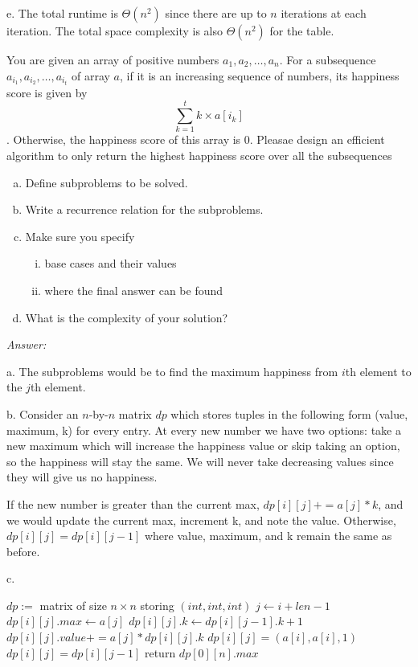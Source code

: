 \documentclass[12pt]{article}
\newenvironment{problem}[2][Problem]{\begin{trivlist}
\item[\hskip \labelsep {\bfseries #1}\hskip \labelsep {\bfseries #2.}]}{\end{trivlist}}
\begin{document}
e. The total runtime is $\Theta(n^2)$ since there are up to $n$ iterations at each iteration. The total space complexity is also $\Theta(n^2)$ for the table.
\begin{problem}{3}
    You are given an array of positive numbers $a_1, a_2, \dots, a_n$. For a subsequence $a_{i_1}, a_{i_2}, \dots, a_{i_t}$ of array $a$, if it is an increasing sequence of numbers, its happiness score is given by $$ \sum_{k=1}^t k \times a[i_k]$$. Otherwise, the happiness score of this array is 0. Pleasae design an efficient algorithm to only return the highest happiness score over all the subsequences
    \begin{enumerate}[a.]
        \item Define subproblems to be solved.
        \item Write a recurrence relation for the subproblems.
        \item Make sure you specify
        \begin{enumerate}[i.]
            \item base cases and their values
            \item where the final answer can be found
        \end{enumerate}
        \item What is the complexity of your solution?
    \end{enumerate}
\end{problem}

\textit{Answer: }

a. The subproblems would be to find the maximum happiness from $i$th element to the $j$th element. 

b. Consider an $n$-by-$n$ matrix $dp$ which stores tuples in the following form (value, maximum, k) for every entry. At every new number we have two options: take a new maximum which will increase the happiness value or skip taking an option, so the happiness will stay the same. We will never take decreasing values since they will give us no happiness.

If the new number is greater than the current max, $dp[i][j] += a[j]*k$, and we would update the current max, increment k, and note the value. Otherwise, $dp[i][j] = dp[i][j-1]$ where value, maximum, and k remain the same as before.

c. 
\begin{algorithmic}
        \State $dp:=$ matrix of size $n \times n$ storing $(int,int,int)$
            \State $j \gets i+len-1$
                    \State $dp[i][j].max \gets a[j]$
                    \State $dp[i][j].k \gets dp[i][j-1].k + 1$
                    \State $dp[i][j].value += a[j]*dp[i][j].k$
                    \State $dp[i][j] = (a[i], a[i], 1)$
                \Else
                    \State $dp[i][j] = dp[i][j-1]$
                \EndIf
           \EndFor
        \EndFor
        \State return $dp[0][n].max$
    \EndProcedure
\end{algorithmic}
\end{document}
